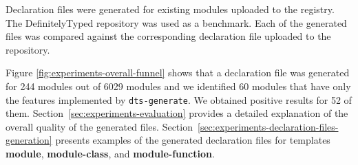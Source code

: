 \documentclass[english,cleveref,autoref,submission]{programming}
\begin{document}
Declaration files were generated for existing modules uploaded to the
\NPM{} registry. The DefinitelyTyped repository was used as a
benchmark. Each of the generated files was compared against the
corresponding declaration file uploaded to the repository.

Figure \ref{fig:experiments-overall-funnel} shows that a declaration file was generated
for 244 modules out of 6029 modules and we identified 60 modules that have only the
features implemented by \texttt{dts-generate}. We obtained positive results for 52 of
them. Section~\ref{sec:experiments-evaluation} provides a detailed explanation of the overall
quality of the generated files.
Section~\ref{sec:experiments-declaration-files-generation} presents examples of the generated declaration files for
templates \textbf{module}, \textbf{module-class}, and \textbf{module-function}. 


\newcommand\funnel[3]{%
\pgfmathsetmacro\mwid{(0.3+\val*0.06)}
\pgfmathsetmacro\mradius{(\val*0.01 + 1)}
\pgfmathsetmacro\mheight{(\val*0.003 + 0.4)}
\pgfmathsetmacro\marc{\mwid-.4}
    \begin{scope}[%
        shift={(0,#1)}, 
        line width=.05pt, 
        scale=0.7,
        yshift=\xi*0.05
        ]
    \draw[black,bottom color=#2, top color=#2] (-\mwid,0) -- (-\mwid+.4,-\mheight) arc (190:350:\marc cm and \mradius mm) -- (\mwid,0);
    \draw[black,fill=#3] (0,0) ellipse (\mwid cm and \mradius mm);
    \path (-\mwid,0) -- (-\mwid+.4,-\mheight) coordinate[midway] (a\xi);
    \end{scope}
}
\end{document}
